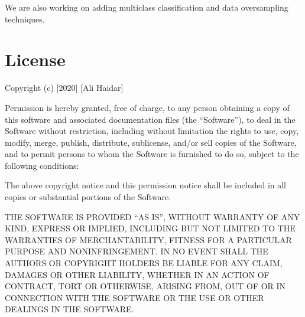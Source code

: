 \documentclass[letterpaper,10pt,english]{sphinxmanual}
\begin{document}
We are also working on adding multi\sphinxhyphen{}class classification and data oversampling techniques.


\chapter{License}
\label{\detokenize{index:license}}
Copyright (c) {[}2020{]} {[}Ali Haidar{]}

Permission is hereby granted, free of charge, to any person obtaining a copy
of this software and associated documentation files (the “Software”), to deal
in the Software without restriction, including without limitation the rights
to use, copy, modify, merge, publish, distribute, sublicense, and/or sell
copies of the Software, and to permit persons to whom the Software is
furnished to do so, subject to the following conditions:

The above copyright notice and this permission notice shall be included in all
copies or substantial portions of the Software.

THE SOFTWARE IS PROVIDED “AS IS”, WITHOUT WARRANTY OF ANY KIND, EXPRESS OR
IMPLIED, INCLUDING BUT NOT LIMITED TO THE WARRANTIES OF MERCHANTABILITY,
FITNESS FOR A PARTICULAR PURPOSE AND NONINFRINGEMENT. IN NO EVENT SHALL THE
AUTHORS OR COPYRIGHT HOLDERS BE LIABLE FOR ANY CLAIM, DAMAGES OR OTHER
LIABILITY, WHETHER IN AN ACTION OF CONTRACT, TORT OR OTHERWISE, ARISING FROM,
OUT OF OR IN CONNECTION WITH THE SOFTWARE OR THE USE OR OTHER DEALINGS IN THE
SOFTWARE.



\renewcommand{\indexname}{Index}
\printindex
\end{document}
